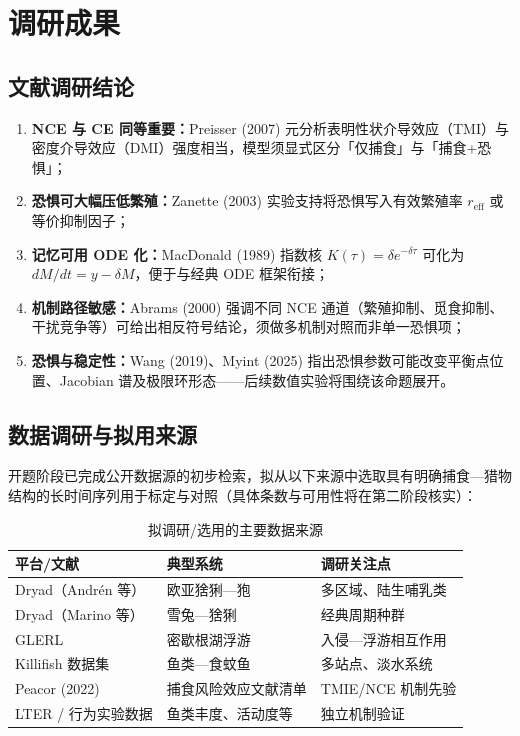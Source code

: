 \documentclass[12pt,a4paper]{ctexart}
\begin{document}
\section{调研成果}

\subsection{文献调研结论}

\begin{enumerate}[label=\arabic*.]
  \item \textbf{NCE 与 CE 同等重要：}Preisser (2007) 元分析表明性状介导效应（TMI）与密度介导效应（DMI）强度相当，模型须显式区分「仅捕食」与「捕食+恐惧」；
  \item \textbf{恐惧可大幅压低繁殖：}Zanette (2003) 实验支持将恐惧写入有效繁殖率 $r_{\text{eff}}$ 或等价抑制因子；
  \item \textbf{记忆可用 ODE 化：}MacDonald (1989) 指数核 $K(\tau)=\delta e^{-\delta\tau}$ 可化为 $dM/dt=y-\delta M$，便于与经典 ODE 框架衔接；
  \item \textbf{机制路径敏感：}Abrams (2000) 强调不同 NCE 通道（繁殖抑制、觅食抑制、干扰竞争等）可给出相反符号结论，须做多机制对照而非单一恐惧项；
  \item \textbf{恐惧与稳定性：}Wang (2019)、Myint (2025) 指出恐惧参数可能改变平衡点位置、Jacobian 谱及极限环形态——后续数值实验将围绕该命题展开。
\end{enumerate}

\subsection{数据调研与拟用来源}

开题阶段已完成公开数据源的初步检索，拟从以下来源中选取具有明确捕食—猎物结构的长时间序列用于标定与对照（具体条数与可用性将在第二阶段核实）：

\begin{table}[h]
  \centering
  \caption{拟调研/选用的主要数据来源}
  \small
  \begin{tabular}{llp{5.5cm}}
    \toprule
    平台/文献 & 典型系统 & 调研关注点 \\
    \midrule
    Dryad（Andrén 等） & 欧亚猞猁—狍 & 多区域、陆生哺乳类 \\
    Dryad（Marino 等） & 雪兔—猞猁 & 经典周期种群 \\
    GLERL & 密歇根湖浮游 & 入侵—浮游相互作用 \\
    Killifish 数据集 & 鱼类—食蚊鱼 & 多站点、淡水系统 \\
    Peacor (2022) & 捕食风险效应文献清单 & TMIE/NCE 机制先验 \\
    LTER / 行为实验数据 & 鱼类丰度、活动度等 & 独立机制验证 \\
    \bottomrule
  \end{tabular}
\end{table}
\end{document}
